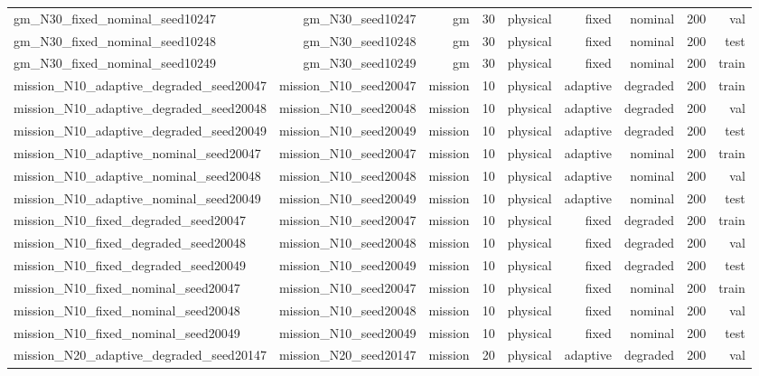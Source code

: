 \begin{tabular}{lrrrrrrrr}
gm\_N30\_fixed\_nominal\_seed10247 & gm\_N30\_seed10247 & gm & 30 & physical & fixed & nominal & 200 & val \\
gm\_N30\_fixed\_nominal\_seed10248 & gm\_N30\_seed10248 & gm & 30 & physical & fixed & nominal & 200 & test \\
gm\_N30\_fixed\_nominal\_seed10249 & gm\_N30\_seed10249 & gm & 30 & physical & fixed & nominal & 200 & train \\
mission\_N10\_adaptive\_degraded\_seed20047 & mission\_N10\_seed20047 & mission & 10 & physical & adaptive & degraded & 200 & train \\
mission\_N10\_adaptive\_degraded\_seed20048 & mission\_N10\_seed20048 & mission & 10 & physical & adaptive & degraded & 200 & val \\
mission\_N10\_adaptive\_degraded\_seed20049 & mission\_N10\_seed20049 & mission & 10 & physical & adaptive & degraded & 200 & test \\
mission\_N10\_adaptive\_nominal\_seed20047 & mission\_N10\_seed20047 & mission & 10 & physical & adaptive & nominal & 200 & train \\
mission\_N10\_adaptive\_nominal\_seed20048 & mission\_N10\_seed20048 & mission & 10 & physical & adaptive & nominal & 200 & val \\
mission\_N10\_adaptive\_nominal\_seed20049 & mission\_N10\_seed20049 & mission & 10 & physical & adaptive & nominal & 200 & test \\
mission\_N10\_fixed\_degraded\_seed20047 & mission\_N10\_seed20047 & mission & 10 & physical & fixed & degraded & 200 & train \\
mission\_N10\_fixed\_degraded\_seed20048 & mission\_N10\_seed20048 & mission & 10 & physical & fixed & degraded & 200 & val \\
mission\_N10\_fixed\_degraded\_seed20049 & mission\_N10\_seed20049 & mission & 10 & physical & fixed & degraded & 200 & test \\
mission\_N10\_fixed\_nominal\_seed20047 & mission\_N10\_seed20047 & mission & 10 & physical & fixed & nominal & 200 & train \\
mission\_N10\_fixed\_nominal\_seed20048 & mission\_N10\_seed20048 & mission & 10 & physical & fixed & nominal & 200 & val \\
mission\_N10\_fixed\_nominal\_seed20049 & mission\_N10\_seed20049 & mission & 10 & physical & fixed & nominal & 200 & test \\
mission\_N20\_adaptive\_degraded\_seed20147 & mission\_N20\_seed20147 & mission & 20 & physical & adaptive & degraded & 200 & val \\

\end{tabular}
